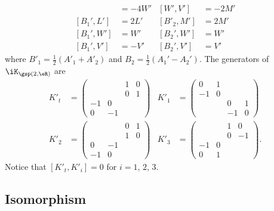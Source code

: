 \begin{align*}
	[L',V']   & =-4W' & [W',V']   & =-2M' \\
	[B_1',L'] & =2L'  & [B'_2,M'] & =2M'  \\
	[B_1',W'] & =W'   & [B_2',W'] & =W'   \\
	[B_1',V'] & =-V'  & [B_2',V'] & =V'
\end{align*}
where $B'_1=\frac{ 1 }{2}(A'_1+A'_2)$ and $B_2=\frac{ 1 }{2}(A_1'-A_2')$. The generators of $\iK_{\gsp(2,\eR)}$ are
\begin{align*}
	K'_t & =
	\begin{pmatrix}
		   &    & 1 & 0 \\
		   &    & 0 & 1 \\
		-1 & 0          \\
		0  & -1
	\end{pmatrix}
	     & K'_1 & =
	\begin{pmatrix}
		0 & 1          \\-1&0\\
		  &   & 0  & 1 \\
		  &   & -1 & 0
	\end{pmatrix} \\
	K'_2 & =
	\begin{pmatrix}
		 &  & 0 & 1 \\&&1&0\\0&-1\\-1&0
	\end{pmatrix}
	     & K'_3 & =
	\begin{pmatrix}
		   &   & 1 & 0  \\
		   &   & 0 & -1 \\
		-1 & 0          \\
		0  & 1
	\end{pmatrix}.
\end{align*}
Notice that $[K'_t,K'_i]=0$ for $i=1$, $2$, $3$.


\subsection{Isomorphism}		\label{SubSecIsosp}

